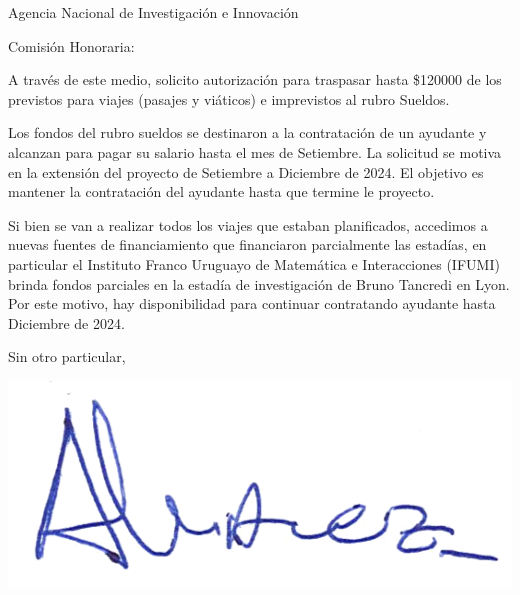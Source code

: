 \documentclass{letter}\usepackage[]{graphicx}\usepackage[]{xcolor}
\date{Montevideo, 22 de Agosto de 2024}
\begin{document}
\begin{letter}{Agencia Nacional de Investigación e Innovación}
\opening{Comisión Honoraria:}

A través de este medio, solicito autorización para traspasar hasta \$120000 de los previstos para viajes (pasajes y viáticos) e imprevistos al rubro Sueldos. 

Los fondos del rubro sueldos se destinaron a la contratación de un ayudante y alcanzan para pagar su salario hasta el mes de Setiembre. La solicitud se motiva en la extensión del proyecto de Setiembre a Diciembre de 2024. El objetivo es mantener la contratación del ayudante hasta que termine le proyecto. 

Si bien se van a realizar todos los viajes que estaban planificados, accedimos a nuevas fuentes de financiamiento que financiaron parcialmente las estadías, en particular el Instituto Franco Uruguayo de Matemática e Interacciones (IFUMI) brinda fondos parciales en la estadía de investigación de Bruno Tancredi en Lyon. Por este motivo, hay disponibilidad para continuar contratando ayudante hasta Diciembre de 2024. 


\closing{Sin otro particular,}
\begin{center}
\includegraphics[scale=.5]{../firma_nacho}
\end{center}

\end{letter}
\end{document}
